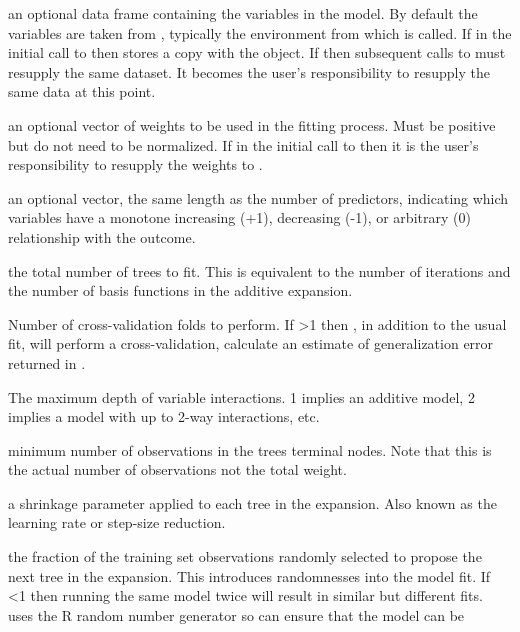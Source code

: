 \documentclass{article}
\begin{document}
\begin{Arguments}
\begin{ldescription}
\item[\code{data}] an optional data frame containing the variables in the model. By
default the variables are taken from , typically 
the environment from which  is called. If  in 
the initial call to  then  stores a copy with the 
object. If  then subsequent calls to 
 must resupply the same dataset. It becomes the user's 
responsibility to resupply the same data at this point.
\item[\code{weights}] an optional vector of weights to be used in the fitting process. 
Must be positive but do not need to be normalized. If  
in the initial call to  then it is the user's responsibility to 
resupply the weights to .
\item[\code{var.monotone}] an optional vector, the same length as the number of
predictors, indicating which variables have a monotone increasing (+1),
decreasing (-1), or arbitrary (0) relationship with the outcome.
\item[\code{n.trees}] the total number of trees to fit. This is equivalent to the
number of iterations and the number of basis functions in the additive
expansion.
\item[\code{cv.folds}] Number of cross-validation folds to perform. If >1 then
, in addition to the usual fit, will perform a cross-validation, calculate
an estimate of generalization error returned in .
\item[\code{interaction.depth}] The maximum depth of variable interactions. 1 implies
an additive model, 2 implies a model with up to 2-way interactions, etc.
\item[\code{n.minobsinnode}] minimum number of observations in the trees terminal
nodes. Note that this is the actual number of observations not the total
weight.
\item[\code{shrinkage}] a shrinkage parameter applied to each tree in the expansion.
Also known as the learning rate or step-size reduction.
\item[\code{bag.fraction}] the fraction of the training set observations randomly
selected to propose the next tree in the expansion. This introduces randomnesses
into the model fit. If <1 then running the same model twice
will result in similar but different fits.  uses the R random number
generator so  can ensure that the model can be

\end{ldescription}
\end{Arguments}
\end{document}
